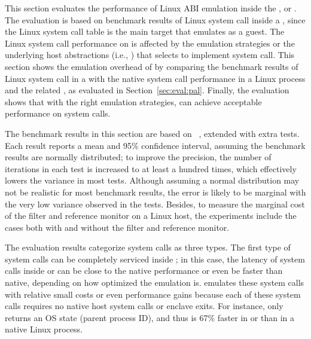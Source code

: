 This section evaluates the performance
of Linux ABI emulation
inside the \graphene{} \libos{},
or \thelibos{}.
The evaluation is based on benchmark results
of Linux system call inside a \picoproc{},
since the Linux system call table is the main target that \thelibos{} emulates
as a guest.
The Linux system call performance
on \thelibos{}
is affected by the emulation strategies
or the underlying host abstractions (i.e., \hostapis{})
that \thelibos{}
selects to implement system call.
This section
shows the emulation overhead of \thelibos{}
by comparing the benchmark results
of Linux system call in a \picoproc{} with the native system call performance in a Linux process
and the related \hostapis{}, as evaluated in Section~\ref{sec:eval:pal}.
Finally,
the evaluation shows that with the right emulation strategies,
\thelibos{} can achieve acceptable performance on system calls.


The benchmark results in this section are based on
\lmbenchwithver{}~\cite{McVoy:lmbench},
extended with extra tests.
Each result
reports a mean and 95\% confidence interval,
assuming the benchmark results are normally distributed;
to improve the precision,
the number of iterations in each test is increased to at least a hundred times, which effectively lowers the variance
in most tests.
Although assuming a normal distribution may not be realistic for most benchmark results,
the error is likely to be marginal with the very low variance
observed in the tests.
Besides, to measure the marginal cost of the \seccomp{} filter and reference monitor on a Linux host,
the experiments include the cases both with
and without the \seccomp{} filter and reference monitor.


The evaluation results categorize
system calls as three types.
The first type of system calls can be completely serviced inside \thelibos{};
in this case, the latency of system calls
inside \graphene{} or \graphenesgx{}
can be close to the native performance
or even be faster than native,
depending on how optimized the emulation is.
\graphene{} emulates
these system calls with relative small costs or even performance gains
because each of these system calls requires
no native host system calls
or enclave exits.
For instance,
 only returns an OS state
(parent process ID),
and thus is 67\% faster
in \graphene{} or \graphenesgx{}
than in a native Linux process.


